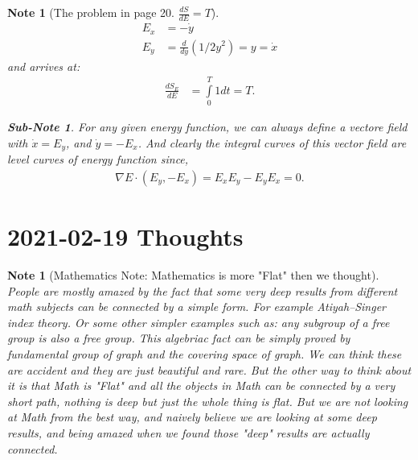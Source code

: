 \documentclass[pdf]{article}
\newtheorem{note}[theorem]{Note}
\newtheorem{subnote}[corollary]{Sub-Note}
\begin{document}
\begin{note}[The problem in page 20. $\frac{dS}{dE} = T$]
\begin{align}
E_x &= -\dot{y}\\
E_y &= \frac{d}{dy}(1/2y^2) = y = \dot{x}
\end{align}
and arrives at:
\begin{align*}
\frac{dS_E}{dE} &= \int\limits_0^T 1 dt = T.
\end{align*}
\begin{subnote}
For any given energy function, we can always define a vectore field with $\dot{x} = E_y$, and $\dot{y} = -E_x$. And clearly the integral curves of this vector field are level curves of energy function since,
\begin{align*}
\nabla E\cdot (E_y, -E_x) = E_xE_y - E_yE_x = 0.
\end{align*}
\end{subnote}
\end{note}

\section{2021-02-19 Thoughts}
\begin{note}[Mathematics Note: Mathematics is more "Flat" then we thought]
People are mostly amazed by the fact that some very deep results from different math subjects can be connected by a simple form. For example Atiyah–Singer index theory. Or some other simpler examples such as: any subgroup of a free group is also a free group. This algebriac fact can be simply proved by fundamental group of graph and the covering space of graph. We can think these are accident and they are just beautiful and rare. But the other way to think about it is that Math is "Flat" and all the objects in Math can be connected by a very short path, nothing is deep but just the whole thing is flat. But we are not looking at Math from the best way, and naively believe we are looking at some deep results, and being amazed when we found those "deep" results are actually connected.
\end{note}
\end{document}
